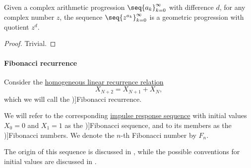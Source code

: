 \begin{proposition}\label{thm:arithmetic_to_geometric_progression}
  Given a complex arithmetic progression \( \seq{ a_k }_{k=0}^\infty \) with difference \( d \), for any complex number \( z \), the sequence \( \seq{ z^{a_k} }_{k=0}^\infty \) is a geometric progression with quotient \( z^d \).
\end{proposition}
\begin{proof}
  Trivial.
\end{proof}

\paragraph{Fibonacci recurrence}

\begin{definition}\label{def:fibonacci_numbers}
  Consider the \hyperref[def:homogeneous_linear_recurrence]{homogeneous linear recurrence relation}
  \begin{equation}\label{eq:def:fibonacci_numbers}
    X_{N+2} = X_{N+1} + X_N,
  \end{equation}
  which we will call the \term[en=Fibonacci recurrence (\cite[8]{Wilf1994GeneratingFunctionsOnline})]{Fibonacci recurrence}.

  We will refer to the corresponding \hyperref[def:recurrence_relation_space]{impulse response sequence} with initial values \( X_0 = 0 \) and \( X_1 = 1 \) as the \term[ru=последовательность Фибоначчи (\cite[exerc. 7.15]{ГашковЧубариков2005СложностьВычисления})]{Fibonacci sequence}, and to its members as the \term[ru=числа Фибоначчи (\cite[\S 5.7.3]{Новиков2013ДискретнаяМатематика})]{Fibonacci numbers}. We denote the \( n \)-th Fibonacci number by \( F_n \).
\end{definition}
\begin{comments}
  \item The origin of this sequence is discussed in , while the possible conventions for initial values are discussed in .
\end{comments}

